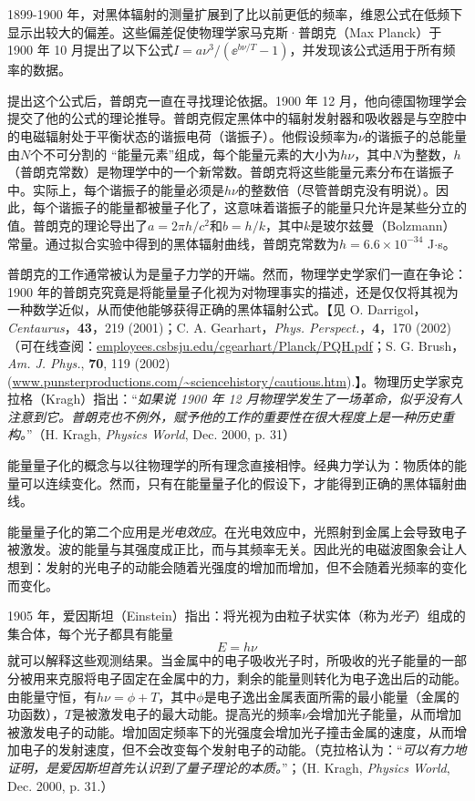 	1899-1900 年，对黑体辐射的测量扩展到了比以前更低的频率，维恩公式在低频下显示出较大的偏差。这些偏差促使物理学家马克斯·普朗克（Max Planck）于 1900 年 10 月提出了以下公式$I=a \nu^3 \Big/ \left(\ee^{b\nu / T}-1\right)$，并发现该公式适用于所有频率的数据。

	提出这个公式后，普朗克一直在寻找理论依据。1900 年 12 月，他向德国物理学会提交了他的公式的理论推导。普朗克假定黑体中的辐射发射器和吸收器是与空腔中的电磁辐射处于平衡状态的谐振电荷（谐振子）。他假设频率为$\nu$的谐振子的总能量由$N$个不可分割的 “能量元素”组成，每个能量元素的大小为$h\nu$，其中$N$为整数，$h$（普朗克常数）是物理学中的一个新常数。普朗克将这些能量元素分布在谐振子中。实际上，每个谐振子的能量必须是$h\nu$的整数倍（尽管普朗克没有明说）。因此，每个谐振子的能量都被量子化了，这意味着谐振子的能量只允许是某些分立的值。普朗克的理论导出了$a=2 \pi  h/c^2$和$b=h/k$，其中$k$是玻尔兹曼（Bolzmann）常量。通过拟合实验中得到的黑体辐射曲线，普朗克常数为$h=6.6 \times 10^{-34}$ J$\cdot$s。

	普朗克的工作通常被认为是量子力学的开端。然而，物理学史学家们一直在争论：1900 年的普朗克究竟是将能量量子化视为对物理事实的描述，还是仅仅将其视为一种数学近似，从而使他能够获得正确的黑体辐射公式。【见 O. Darrigol，\textit{Centaurus}，\textbf{43}，219 (2001)；C. A. Gearhart，\textit{Phys. Perspect.}，\textbf{4}，170 (2002)（可在线查阅：\url{employees.csbsju.edu/cgearhart/Planck/PQH.pdf}；S. G. Brush，\textit{Am. J. Phys.}, \textbf{70}, 119 (2002) (\url{www.punsterproductions.com/~sciencehistory/cautious.htm}).】。物理历史学家克拉格（Kragh）指出：“\textit{如果说 1900 年 12 月物理学发生了一场革命，似乎没有人注意到它。普朗克也不例外，赋予他的工作的重要性在很大程度上是一种历史重构。}”（H. Kragh, \textit{Physics World}, Dec. 2000, p. 31）

	能量量子化的概念与以往物理学的所有理念直接相悖。经典力学认为：物质体的能量可以连续变化。然而，只有在能量量子化的假设下，才能得到正确的黑体辐射曲线。

	能量量子化的第二个应用是\textit{光电效应}。在光电效应中，光照射到金属上会导致电子被激发。波的能量与其强度成正比，而与其频率无关。因此光的电磁波图象会让人想到：发射的光电子的动能会随着光强度的增加而增加，但不会随着光频率的变化而变化。

	1905 年，爱因斯坦（Einstein）指出：将光视为由粒子状实体（称为\textit{光子}）组成的集合体，每个光子都具有能量
	\begin{equation}
		\boxed{E=h\nu}
		\label{eq:1.3 photoelectric effect equation}
	\end{equation}
	就可以解释这些观测结果。当金属中的电子吸收光子时，所吸收的光子能量的一部分被用来克服将电子固定在金属中的力，剩余的能量则转化为电子逸出后的动能。由能量守恒，有$h\nu = \phi+ T$，其中$\phi$是电子逸出金属表面所需的最小能量（金属的功函数），$T$是被激发电子的最大动能。提高光的频率$\nu$会增加光子能量，从而增加被激发电子的动能。增加固定频率下的光强度会增加光子撞击金属的速度，从而增加电子的发射速度，但不会改变每个发射电子的动能。（克拉格认为：“\textit{可以有力地证明，是爱因斯坦首先认识到了量子理论的本质。}”；（H. Kragh, \textit{Physics World}, Dec. 2000, p. 31.）

